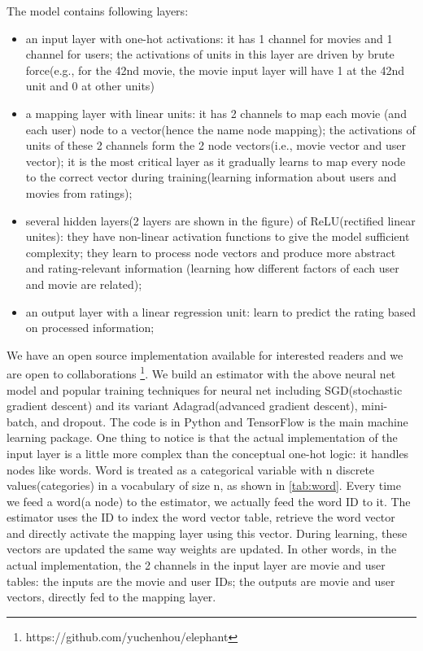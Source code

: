 \documentclass{article}
\begin{document}
The model contains following layers:
\begin{itemize}
	\item an input layer with one-hot activations: it has 1 channel for movies 
	and 1 channel for users;
	the activations of units in this layer are driven by brute force(e.g., for 
	the 42nd movie, the movie input layer will have 1 at the 42nd unit and 0 at 
	other units)
	\item a mapping layer with linear units: it has 2 channels to map each 
	movie (and each user) node to a vector(hence the name node mapping);
	the activations of units of these 2 channels form the 2 node vectors(i.e., 
	movie vector and user vector);
	it is the most critical layer as it gradually learns to map every node to 
	the correct vector during training(learning information about users and 
	movies from ratings);
	\item several hidden layers(2 layers are shown in the figure) of 
	ReLU(rectified linear unites):
	they have non-linear activation functions to give the model sufficient 
	complexity; 
	they learn to process node vectors and produce more abstract and 
	rating-relevant information (learning how different factors of each user 
	and movie are related);
	\item an output layer with a linear regression unit: learn to predict the 
	rating based on processed information;
\end{itemize}
We have an open source implementation available for interested readers and we 
are open to collaborations \footnote{https://github.com/yuchenhou/elephant}.
We build an estimator with the above neural net model and popular training 
techniques for neural net including SGD(stochastic gradient descent) and its 
variant Adagrad(advanced gradient descent), mini-batch, and dropout.
The code is in Python and TensorFlow \cite{tensorflow2015-whitepaper} 
is the main machine learning package.
One thing to notice is that the actual implementation of the input layer is a 
little more complex than the conceptual one-hot logic: it handles nodes like 
words.
Word is treated as a categorical variable with n discrete 
values(categories) in a vocabulary of size n, as shown in \autoref{tab:word}.
Every time we feed a word(a node) to the estimator, we actually feed the word 
ID to it. The estimator uses the ID to index the word vector table, retrieve 
the word vector and directly activate the mapping layer using this vector. 
During learning, these vectors are updated the same way weights are updated.
In other words, in the actual implementation, the 2 channels in the input layer 
are movie and user tables: the inputs are the movie and user IDs; the outputs 
are movie and user vectors, directly fed to the mapping layer.
\end{document}
